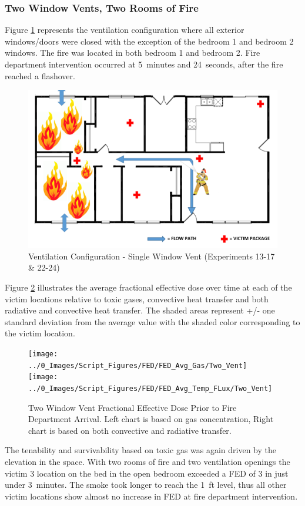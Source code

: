 \documentclass[12pt,oneside]{book}
\begin{document}
\subsubsection{Two Window Vents, Two Rooms of Fire}

Figure \ref{fig:Vent_Profile-Two_Vent} represents the ventilation configuration where all exterior windows/doors were closed with the exception of the bedroom 1 and bedroom 2 windows. The fire was located in both bedroom 1 and bedroom 2. Fire department intervention occurred at 5~minutes and 24~seconds, after the fire reached a flashover. 

\begin{figure}[H]
	\centering
	\includegraphics[width=.65\textwidth]{../0_Images/Ventilation_Configurations/Two_Vent.png}
	\caption{Ventilation Configuration - Single Window Vent (Experiments 13-17 \& 22-24)}
	\label{fig:Vent_Profile-Two_Vent}
\end{figure}

Figure \ref{fig:FED_TwoVent} illustrates the average fractional effective dose over time at each of the victim locations relative to toxic gases, convective heat transfer and both radiative and convective heat transfer. The shaded areas represent +/- one standard deviation from the average value with the shaded color corresponding to the victim location. 

\begin{figure}[H]
	\centering
	\texttt{[image: ../0\_Images/Script\_Figures/FED/FED\_Avg\_Gas/Two\_Vent]}
	\texttt{[image: ../0\_Images/Script\_Figures/FED/FED\_Avg\_Temp\_FLux/Two\_Vent]}
	\caption[Two Window Vent Fractional Effective Dose]{Two Window Vent Fractional Effective Dose Prior to Fire Department Arrival. Left chart is based on gas concentration, Right chart is based on both convective and radiative transfer.}
	\label{fig:FED_TwoVent}
\end{figure}

The tenability and survivability based on toxic gas was again driven by the elevation in the space. With two rooms of fire and two ventilation openings the victim 3 location on the bed in the open bedroom exceeded a FED of 3 in just under 3~minutes. The smoke took longer to reach the 1~ft level, thus all other victim locations show almost no increase in FED at fire department intervention.
\end{document}
